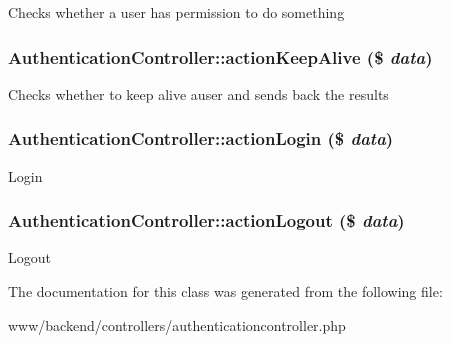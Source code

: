 Checks whether a user has permission to do something \hypertarget{classAuthenticationController_a68500ed26f6a8178e3e255f380ec8455}{
\subsubsection[{actionKeepAlive}]{\setlength{\rightskip}{0pt plus 5cm}AuthenticationController::actionKeepAlive (\$ {\em data})}}
\label{classAuthenticationController_a68500ed26f6a8178e3e255f380ec8455}
Checks whether to keep alive auser and sends back the results \hypertarget{classAuthenticationController_a508a7e66f7024926a2a9d3d24adb3eba}{
\subsubsection[{actionLogin}]{\setlength{\rightskip}{0pt plus 5cm}AuthenticationController::actionLogin (\$ {\em data})}}
\label{classAuthenticationController_a508a7e66f7024926a2a9d3d24adb3eba}
Login \hypertarget{classAuthenticationController_acdc76a1b78a881df16ae6beac5ca6ae3}{
\subsubsection[{actionLogout}]{\setlength{\rightskip}{0pt plus 5cm}AuthenticationController::actionLogout (\$ {\em data})}}
\label{classAuthenticationController_acdc76a1b78a881df16ae6beac5ca6ae3}
Logout 

The documentation for this class was generated from the following file:\begin{DoxyCompactItemize}
\item 
www/backend/controllers/authenticationcontroller.php\end{DoxyCompactItemize}
